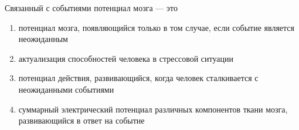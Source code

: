 
Связанный с событиями потенциал мозга — это

\begin{enumerate}
    \item потенциал мозга, появляющийся только в том случае, если событие является неожиданным
    \item актуализация способностей человека в стрессовой ситуации
    \item потенциал действия, развивающийся, когда человек сталкивается с неожиданными событиями
    \item суммарный электрический потенциал различных компонентов ткани мозга, развивающийся в ответ на событие
\end{enumerate}